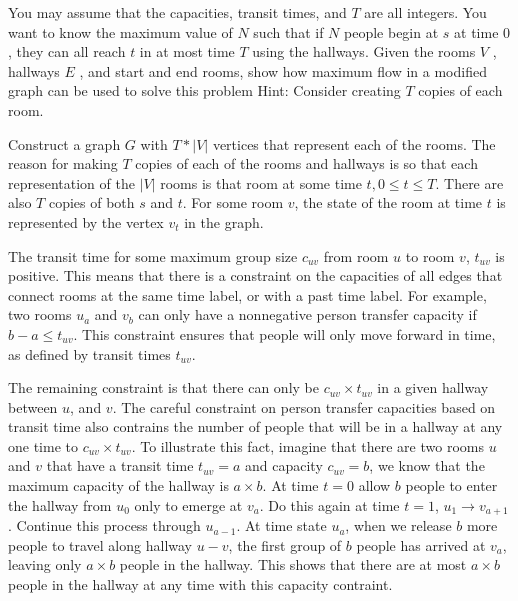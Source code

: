 \documentclass[11pt]{article}
\begin{document}
You may assume that the capacities, transit times, and $T$ are all integers. 
You want to know the maximum value of $N$ such that if $N$ people begin at $s$ 
at time $0$, they can all reach $t$ in at most time $T$ using the hallways. 
Given the rooms $V$ , hallways $E$ , and start and end rooms, show how maximum 
flow in a modified graph can be used to solve this problem
Hint: Consider creating $T$ copies of each room.

Construct a graph $G$ with $T*|V|$ vertices that represent each of the rooms.
The reason for making $T$ 
copies of each of the rooms and hallways is so that each representation of the $|V|$ 
rooms is that room at some time $t, 0\leq t \leq T$. There are also $T$ copies of 
both $s$ and $t$. For some room  $v$, the state of the room at time $t$ is 
represented by the vertex $v_t$ in the graph.

The transit time for some maximum group size $c_{uv}$ from room $u$ to
room $v$, $t_{uv}$ is positive. This means that there is a constraint on the 
capacities of all edges that connect rooms at the same time label, or with a past
time label. For example, two rooms $u_a$ and $v_b$ can only have a nonnegative 
person transfer capacity if $b-a \leq t_{uv}$. This constraint ensures that people
will only move forward in time, as defined by transit times $t_{uv}$. 

The remaining constraint is that there can only be $c_{uv}\times t_{uv}$ in a given
hallway between $u$, and $v$. The careful constraint on person transfer capacities 
based on transit time also contrains the number of people that will be in a hallway
at any one time to $c_{uv}\times t_{uv}$. To illustrate this fact, imagine that 
there are two rooms $u$ and $v$ that have a transit time $t_{uv}=a$ and capacity 
$c_{uv}=b$, we know that the maximum capacity of the hallway is $a\times b$.
At time $t=0$ allow $b$ people to enter the hallway from $u_0$ only to emerge
at $v_a$. Do this again at time $t=1$, $u_1\rightarrow v_{a+1}$. 
Continue this process through $u_{a-1}$. At time state $u_a$, when we release
$b$ more people to travel along hallway $u - v$, the first group of $b$ people has
arrived at $v_a$, leaving only $a\times b$ people in the hallway. 
This shows that there are at most $a\times b$ people in the hallway at any time
with this capacity contraint.



\label{pg:end-of-p4}

%
\end{document}
